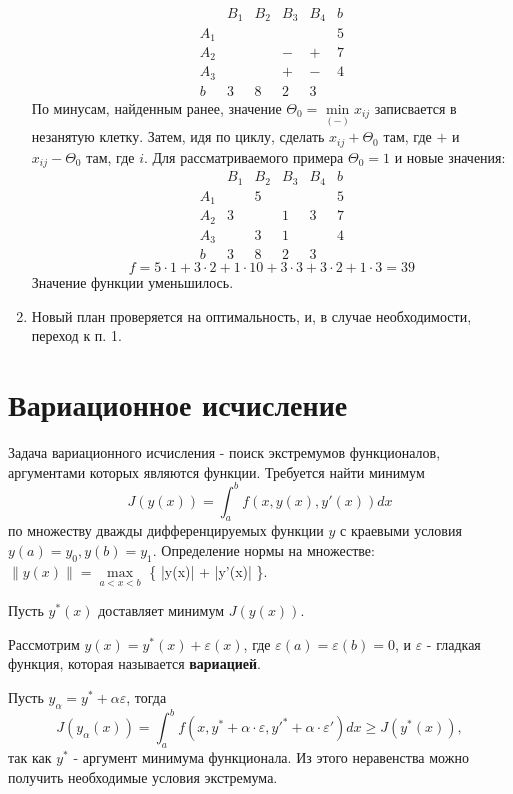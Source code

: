 \documentclass[a4paper, 14pt]{extarticle}
\numberwithin{equation}{section}
\begin{document}
\begin{enumerate}
    \[ \begin{array}{c|cccc|c}
            & B_1 & B_2 & B_3 & B_4 & b\\
        \hline
        A_1 & & & & & 5 \\
        A_2 & & & - & + & 7\\
        A_3 & & & + & - & 4\\
        \hline
        b & 3 & 8 & 2 & 3
    \end{array} \]
    По минусам, найденным ранее, значение $\Theta_0 = \min\limits_{(-)} x_{ij}$ записвается в незанятую клетку. Затем, идя по циклу, сделать $x_{ij} + \Theta_0$ там, где $+$ и $x_{ij} - \Theta_0$ там, где $i$.
    Для рассматриваемого примера $\Theta_0 = 1$ и новые значения:
    \[ \begin{array}{c|cccc|c}
            & B_1 & B_2 & B_3 & B_4 & b\\
        \hline
        A_1 & & 5 & & & 5 \\
        A_2 & 3 & &  1 & 3 & 7\\
        A_3 & & 3 & 1 & & 4\\
        \hline
        b & 3 & 8 & 2 & 3
    \end{array} \]
    \[ f = 5 \cdot 1 + 3 \cdot 2 + 1 \cdot 10 + 3 \cdot 3 + 3 \cdot 2 + 1 \cdot 3 = 39 \]
    Значение функции уменьшилось.
    \item Новый план проверяется на оптимальность, и, в случае необходимости, переход к п. 1.
\end{enumerate}
\section{Вариационное исчисление}
    Задача вариационного исчисления - поиск экстремумов функционалов, аргументами которых являются функции. Требуется найти минимум
    \[ J(y(x)) = \int_a^b f(x,y(x),y'(x))dx \]
    по множеству дважды дифференцируемых функции $y$ с краевыми условия $y(a)=y_0, y(b)=y_1$.
    Определение нормы на множестве: $\lVert y(x) \rVert = \max\limits_{a < x < b}$ \{ |y(x)| + |y'(x)| \}. 

    Пусть $y^*(x)$ доставляет минимум $J(y(x))$.

    Рассмотрим $y(x)=y^*(x)+\varepsilon(x)$, где $\varepsilon(a) = \varepsilon(b)=0$, и $\varepsilon$ - гладкая функция, которая называется \textbf{вариацией}. 

   Пусть $y_\alpha = y^* + \alpha \varepsilon$, тогда
   \[ J(y_\alpha(x)) = \int_a^b f(x, y^* + \alpha \cdot \varepsilon, y'^* + \alpha \cdot \varepsilon' ) dx \ge J(y^*(x)), \]
    так как $y^*$ - аргумент минимума функционала. Из этого неравенства можно получить необходимые условия экстремума.
\end{document}
